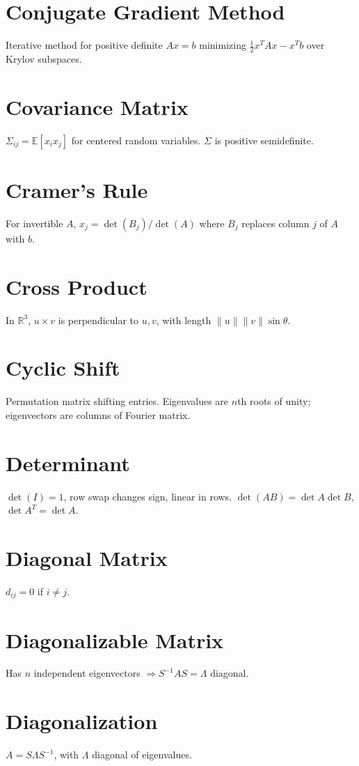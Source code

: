 \documentclass[12pt]{book}
\begin{document}
\chapter{Conjugate Gradient Method}
Iterative method for positive definite $Ax=b$ minimizing $\tfrac{1}{2}x^T A x - x^T b$ over Krylov subspaces.

\chapter{Covariance Matrix}
$\Sigma_{ij} = \mathbb{E}[x_i x_j]$ for centered random variables. $\Sigma$ is positive semidefinite.

\chapter{Cramer’s Rule}
For invertible $A$, $x_j = \det(B_j)/\det(A)$ where $B_j$ replaces column $j$ of $A$ with $b$.

\chapter{Cross Product}
In $\mathbb{R}^3$, $u \times v$ is perpendicular to $u,v$, with length $\|u\|\|v\|\sin\theta$.

\chapter{Cyclic Shift}
Permutation matrix shifting entries. Eigenvalues are $n$th roots of unity; eigenvectors are columns of Fourier matrix.

\chapter{Determinant}
$\det(I)=1$, row swap changes sign, linear in rows. $\det(AB)=\det A \det B$, $\det A^T = \det A$.

\chapter{Diagonal Matrix}
$d_{ij}=0$ if $i\neq j$.

\chapter{Diagonalizable Matrix}
Has $n$ independent eigenvectors $\Rightarrow S^{-1} A S = \Lambda$ diagonal.

\chapter{Diagonalization}
$A=S\Lambda S^{-1}$, with $\Lambda$ diagonal of eigenvalues.
\end{document}
